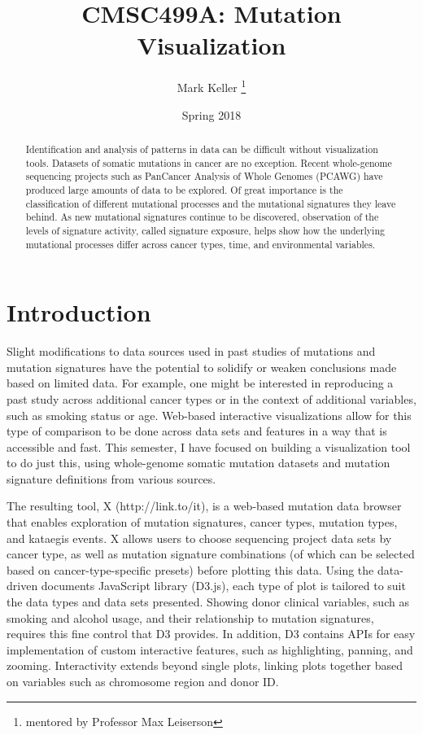 \documentclass[12pt, letterpaper]{article}
\title{CMSC499A: Mutation Visualization}
\author{Mark Keller \thanks{mentored by Professor Max Leiserson}}
\date{Spring 2018}
\begin{document}
\maketitle

\begin{abstract}
Identification and analysis of patterns in data can be difficult without visualization tools. 
Datasets of somatic mutations in cancer are no exception. 
Recent whole-genome sequencing projects such as PanCancer Analysis of Whole Genomes (PCAWG) have produced large amounts of data to be explored.
Of great importance is the classification of different mutational processes and the mutational signatures\cite{alexandrov2013signatures} they leave behind.
As new mutational signatures continue to be discovered, observation of the levels of signature activity, called signature exposure, helps show how the underlying mutational processes differ across cancer types, time, and environmental variables.
\end{abstract}

\section{Introduction}
Slight modifications to data sources used in past studies of mutations and mutation signatures have the potential to solidify or weaken conclusions made based on limited data.
For example, one might be interested in reproducing a past study across additional cancer types or in the context of additional variables, such as smoking status or age.
Web-based interactive visualizations allow for this type of comparison to be done across data sets and features in a way that is accessible and fast.
This semester, I have focused on building a visualization tool to do just this, using whole-genome somatic mutation datasets and mutation signature definitions from various sources.

The resulting tool, X (http://link.to/it), is a web-based mutation data browser that enables exploration of mutation signatures, cancer types, mutation types, and kataegis events.
X allows users to choose sequencing project data sets by cancer type, as well as mutation signature combinations (of which can be selected based on cancer-type-specific presets) before plotting this data. 
Using the data-driven documents JavaScript library (D3.js)\cite{bostock2011d3}, each type of plot is tailored to suit the data types and data sets presented.
Showing donor clinical variables, such as smoking and alcohol usage, and their relationship to mutation signatures, requires this fine control that D3 provides.
In addition, D3 contains APIs for easy implementation of custom interactive features, such as highlighting, panning, and zooming.
Interactivity extends beyond single plots, linking plots together based on variables such as chromosome region and donor ID.   
\end{document}
